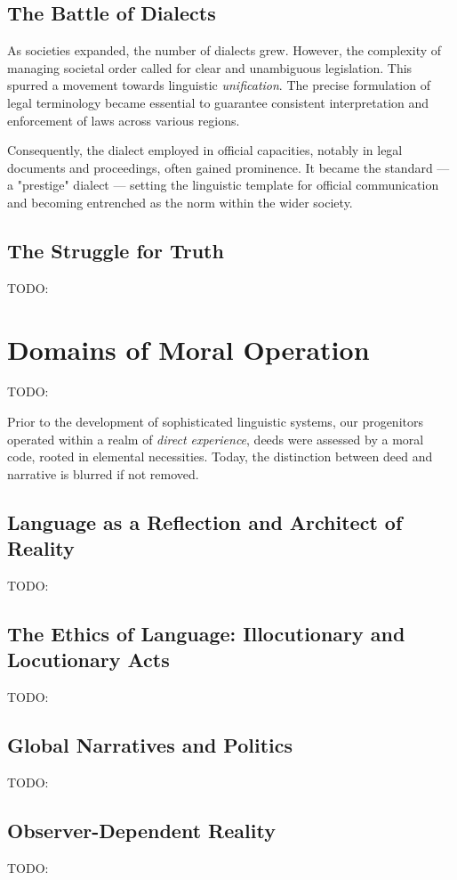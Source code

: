 \documentclass[12pt,a4]{article}
\begin{document}
    \subsection{The Battle of Dialects}
 As societies expanded, the number of dialects grew. However, the complexity of managing societal order called for clear and unambiguous legislation. This spurred a movement towards linguistic \textit{unification}. The precise formulation of legal terminology became essential to guarantee consistent interpretation and enforcement of laws across various regions.
\par
Consequently, the dialect employed in official capacities, notably in legal documents and proceedings, often gained prominence. It became the standard — a "prestige" dialect — setting the linguistic template for official communication and becoming entrenched as the norm within the wider society.

    
    \subsection{The Struggle for Truth}
    TODO:

\section{Domains of Moral Operation}
    TODO:

Prior to the development of sophisticated linguistic systems, our progenitors operated within a realm of\textit{ direct experience}, deeds were assessed by a moral code, rooted in elemental necessities. 
Today, the distinction between deed and narrative is blurred if not removed. 

    \subsection{Language as a Reflection and Architect of Reality}
    TODO:
    \subsection{The Ethics of Language: Illocutionary and Locutionary Acts}
    TODO:
    
    \subsection{Global Narratives and Politics}
    TODO:
    
    \subsection{Observer-Dependent Reality}
    TODO:
    
\end{document}
